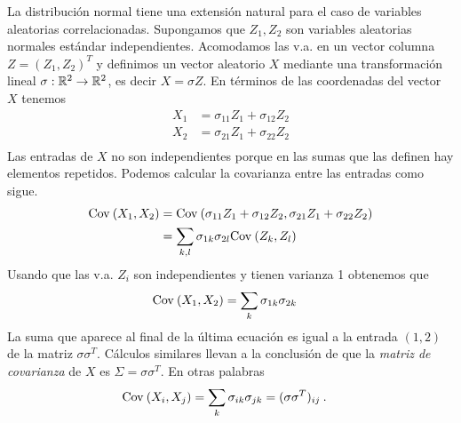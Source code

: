 \documentclass[12pt,reqno]{amsart}\usepackage[]{graphicx}\usepackage[]{color}
\begin{document}
La distribución normal tiene una extensión natural para el caso de variables aleatorias correlacionadas. Supongamos que $Z_1,Z_2$ son variables aleatorias normales estándar independientes. Acomodamos las v.a. en un vector columna $Z = (Z_1,Z_2)^T$ y definimos un vector aleatorio $X$ mediante una transformación lineal $\sigma: \mathbb{R}^2 \to \mathbb{R}^2$, es decir $X = \sigma Z$. En términos de las coordenadas del vector $X$ tenemos
\begin{equation}\label{coordenadasX}
  \begin{split}
  X_1 &= \sigma_{11}Z_1 + \sigma_{12}Z_2\\
  X_2 &= \sigma_{21}Z_1 + \sigma_{22}Z_2\\
  \end{split}
\end{equation}
Las entradas de $X$ no son independientes porque en las sumas que las definen hay elementos repetidos. Podemos calcular la covarianza entre las entradas como sigue.
\begin{equation*}
  \begin{split}
  \mathrm{Cov}\:(X_1 ,X_2) &=\mathrm{Cov}\:(\sigma_{11}Z_1 + \sigma_{12}Z_2,\sigma_{21}Z_1 + \sigma_{22}Z_2 )\\
 &= \sum_{k,l}\sigma_{1k}\sigma_{2l}\mathrm{Cov}\:(Z_k,Z_l)
  \end{split}
\end{equation*}
Usando que las v.a. $Z_i$ son independientes y tienen varianza 1 obtenemos que
\begin{equation}\label{covarianzaX12}
  \begin{split}
  \mathrm{Cov}\:(X_1 ,X_2) &=\sum_{k}\sigma_{1k}\sigma_{2k}
  \end{split}
\end{equation}
La suma que aparece al final de la última ecuación es igual a la entrada $(1,2)$ de la matriz $\sigma\sigma^T$. Cálculos similares llevan a la conclusión de que la \emph{matriz de covarianza} de $X$ es $\Sigma = \sigma\sigma^T$. En otras palabras
\begin{equation}\label{covarianzaX}
  \begin{split}
  \mathrm{Cov}\:(X_i ,X_j) &=\sum_{k}\sigma_{ik}\sigma_{jk}=(\sigma\sigma^T)_{ij}\:.
  \end{split}
\end{equation}
\end{document}
